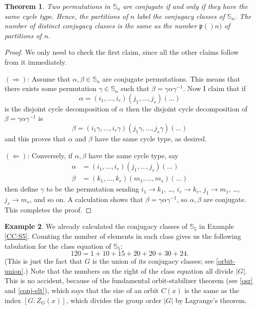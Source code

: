 \documentclass[11pt,oneside]{article}
\newtheorem{thm}{Theorem}[section]
\theoremstyle{definition}
\newtheorem{example}[thm]{Example}
\newcommand{\Sym}{\mathbb{S}}
\newcommand{\ptn}{\mathfrak{p}}
\begin{document}
\begin{thm}\index{conjugacy~classes~of~$\Sym_n$} \label{cycle-type}
Two permutations in $\Sym_n$ are conjugate if and only if they have
the same cycle type. Hence, the partitions of $n$ label the conjugacy
classes of $\Sym_n$. The number of distinct conjugacy classes is the
same as the number $\ptn()n)$ of partitions of $n$.
\end{thm}


\begin{proof}
We only need to check the first claim, since all the other claims
follow from it immediately.

$(\Rightarrow)$: Assume that $\alpha, \beta \in \Sym_n$ are conjugate
permutations.  This means that there exists some permutation $\gamma
\in \Sym_n$ such that $\beta = \gamma \alpha \gamma^{-1}$. Now I claim
that if
\[
   \alpha = (i_1,\dots, i_r)(j_1,\dots,j_s)(\dots)
\]
is the disjoint cycle decomposition of $\alpha$ then the disjoint
cycle decomposition of $\beta = \gamma \alpha \gamma^{-1}$ is 
\[
  \beta = (i_1\gamma,\dots, i_r\gamma)(j_1\gamma,\dots,j_s\gamma)(\dots)
\]
and this proves that $\alpha$ and $\beta$ have the same cycle type, as
desired.

$(\Leftarrow)$: Conversely, if $\alpha, \beta$ have the same cycle
type, say
\begin{align*}
\alpha &= (i_1,\dots, i_r)(j_1,\dots,j_s)(\dots) \\
\beta &= (k_1,\dots, k_r)(m_1,\dots,m_s)(\dots)
\end{align*}
then define $\gamma$ to be the permutation sending $i_1 \to k_1$,
\dots, $i_r \to k_r$, $j_1 \to m_1$, \dots, $j_s \to m_s$, and so on.
A calculation shows that $\beta = \gamma\alpha \gamma^{-1}$, so
$\alpha, \beta$ are conjugate. This completes the proof.
\end{proof}

\begin{example}
We already calculated the conjugacy classes of $\Sym_5$ in Example
\ref{CC:S5}. Counting the number of elements in each class gives us
the following tabulation for the class equation of $\Sym_5$:
\[
  120 = 1+10+15+20+20+30+24.
\]
(This is just the fact that $G$ is the union of its conjugacy classes;
see \ref{orbit-union}.) Note that the numbers on the right of the
class equation all divide $|G|$. This is no accident, because of the
fundamental orbit-stabilizer theorem (see \ref{osr} and
\ref{conj-elt}), which says that the size of an orbit $C(x)$ is the
same as the index $[G:Z_G(x)]$, which divides the group order $|G|$ by
Lagrange's theorem.
\end{example}
\end{document}
